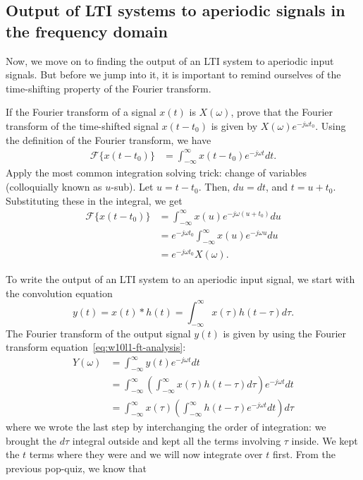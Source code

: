 \subsection{Output of LTI systems to aperiodic signals in the frequency domain}
Now, we move on to finding the output of an LTI system to aperiodic input signals. But before we jump into it, it is important to remind ourselves of the time-shifting property of the Fourier transform.
\begin{popquiz}
If the Fourier transform of a signal $x(t)$ is $X(\omega)$, prove that the Fourier transform of the time-shifted signal $x(t - t_0)$ is given by $X(\omega) e^{-j \omega t_0}$.
\popqsplit
Using the definition of the Fourier transform, we have
\[
\begin{aligned}
\mathcal{F}\{x(t - t_0)\} &= \int_{-\infty}^{\infty} x(t - t_0) e^{-j \omega t} dt.
\end{aligned}
\]
Apply the most common integration solving trick: change of variables (colloquially known as $u$-sub). Let $u = t - t_0$. Then, $du = dt$, and $t = u + t_0$. Substituting these in the integral, we get
\[
\begin{aligned}
\mathcal{F}\{x(t - t_0)\} &= \int_{-\infty}^{\infty} x(u) e^{-j \omega (u + t_0)} du \\
&= e^{-j \omega t_0} \int_{-\infty}^{\infty} x(u) e^{-j \omega u} du \\
&= e^{-j \omega t_0} X(\omega).
\end{aligned}
\]
\end{popquiz}
To write the output of an LTI system to an aperiodic input signal, we start with the convolution equation
\[
y(t) = x(t) * h(t) = \int_{-\infty}^{\infty} x(\tau) h(t - \tau) d\tau.
\]
The Fourier transform of the output signal $y(t)$ is given by using the Fourier transform equation~\eqref{eq:w10l1-ft-analysis}:
\[
\begin{aligned}
Y(\omega) &= \int_{-\infty}^{\infty} y(t) e^{-j \omega t} dt \\
&= \int_{-\infty}^{\infty} \left( \int_{-\infty}^{\infty} x(\tau) h(t - \tau) d\tau \right) e^{-j \omega t} dt \\
&= \int_{-\infty}^{\infty} x(\tau) \left( \int_{-\infty}^{\infty} h(t - \tau) e^{-j \omega t} dt \right) d\tau
\end{aligned}
\]
where we wrote the last step by interchanging the order of integration: we brought the $d\tau$ integral outside and kept all the terms involving $\tau$ inside. We kept the $t$ terms where they were and we will now integrate over $t$ first. From the previous pop-quiz, we know that
